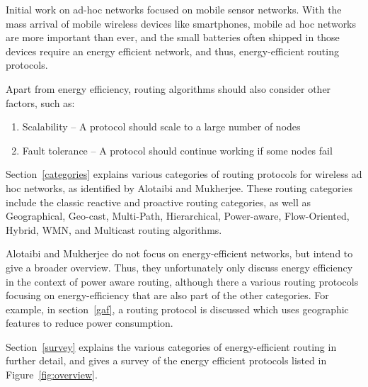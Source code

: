 Initial work on ad-hoc networks focused on mobile sensor networks. With the
mass arrival of mobile wireless devices like smartphones, mobile ad hoc networks
are more important than ever, and the small batteries often shipped in those devices
require an energy efficient network, and thus, energy-efficient routing
protocols.

Apart from energy efficiency, routing algorithms should also consider other
factors, such as:
\begin{enumerate}
   \item Scalability -- A protocol should scale to a large number of nodes
   \item Fault tolerance -- A protocol should continue working if some nodes fail
\end{enumerate}

Section~\ref{categories} explains various categories of routing protocols for
wireless ad hoc networks, as identified by Alotaibi and Mukherjee\cite{alotaibi2012survey}. These
routing categories include the classic reactive and proactive routing categories,
as well as
  Geographical, Geo-cast, Multi-Path, Hierarchical, Power-aware, Flow-Oriented,
  Hybrid, WMN, and Multicast routing algorithms. 


Alotaibi and Mukherjee\cite{alotaibi2012survey} do not focus on energy-efficient networks, but intend to give
a broader overview. Thus, they unfortunately only discuss energy efficiency in the
context of power aware routing, although there a various routing protocols
focusing on energy-efficiency that are also part of the other categories.
For example, in section~\ref{gaf}, a routing protocol is discussed which
uses geographic features to reduce power consumption.

Section~\ref{survey} explains the various categories of energy-efficient
routing in further detail, and gives a survey of the energy efficient protocols
listed in Figure~\ref{fig:overview}.


